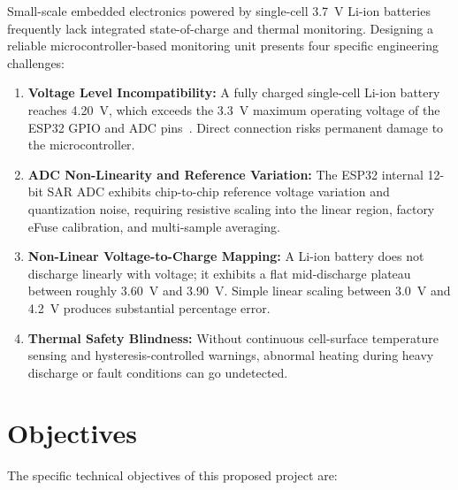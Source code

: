 \documentclass[12pt,a4paper]{article}
\begin{document}
Small-scale embedded electronics powered by single-cell 3.7~V Li-ion batteries frequently lack integrated state-of-charge and thermal monitoring. Designing a reliable microcontroller-based monitoring unit presents four specific engineering challenges:

\begin{enumerate}
    \item \textbf{Voltage Level Incompatibility:} A fully charged single-cell Li-ion battery reaches 4.20~V, which exceeds the 3.3~V maximum operating voltage of the ESP32 GPIO and ADC pins~\cite{espressif_esp32_ds}. Direct connection risks permanent damage to the microcontroller.
    \item \textbf{ADC Non-Linearity and Reference Variation:} The ESP32 internal 12-bit SAR ADC exhibits chip-to-chip reference voltage variation and quantization noise, requiring resistive scaling into the linear region, factory eFuse calibration, and multi-sample averaging.
    \item \textbf{Non-Linear Voltage-to-Charge Mapping:} A Li-ion battery does not discharge linearly with voltage; it exhibits a flat mid-discharge plateau between roughly 3.60~V and 3.90~V. Simple linear scaling between 3.0~V and 4.2~V produces substantial percentage error.
    \item \textbf{Thermal Safety Blindness:} Without continuous cell-surface temperature sensing and hysteresis-controlled warnings, abnormal heating during heavy discharge or fault conditions can go undetected.
\end{enumerate}

\section{Objectives}
\label{sec:objectives}

The specific technical objectives of this proposed project are:
\end{document}
